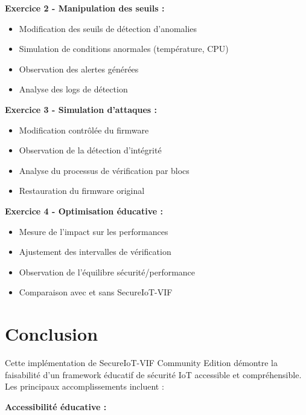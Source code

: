 \textbf{Exercice 2 - Manipulation des seuils :}
\begin{itemize}
    \item Modification des seuils de détection d'anomalies
    \item Simulation de conditions anormales (température, CPU)
    \item Observation des alertes générées
    \item Analyse des logs de détection
\end{itemize}

\textbf{Exercice 3 - Simulation d'attaques :}
\begin{itemize}
    \item Modification contrôlée du firmware
    \item Observation de la détection d'intégrité
    \item Analyse du processus de vérification par blocs
    \item Restauration du firmware original
\end{itemize}

\textbf{Exercice 4 - Optimisation éducative :}
\begin{itemize}
    \item Mesure de l'impact sur les performances
    \item Ajustement des intervalles de vérification
    \item Observation de l'équilibre sécurité/performance
    \item Comparaison avec et sans SecureIoT-VIF
\end{itemize}

\section{Conclusion}

Cette implémentation de SecureIoT-VIF Community Edition démontre la faisabilité d'un framework éducatif de sécurité IoT accessible et compréhensible. Les principaux accomplissements incluent :

\textbf{Accessibilité éducative :}

